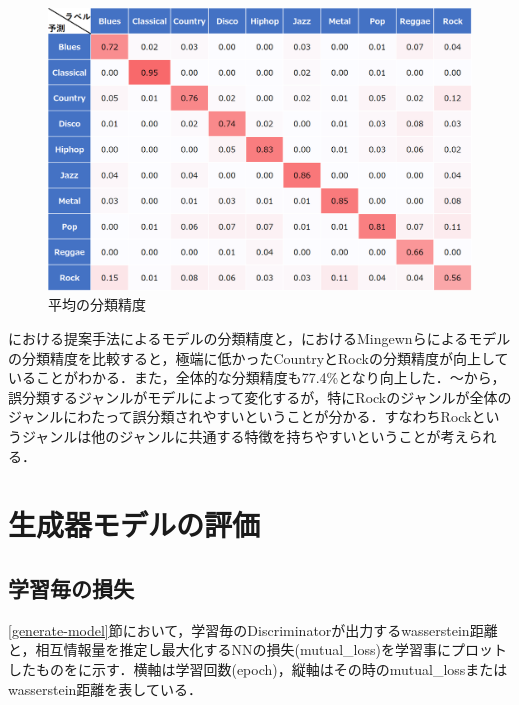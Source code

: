 \begin{figure}[htbp]
	\begin{center}
		\includegraphics[scale=0.5]{./images/classify-model/crossval.png}
		\caption{平均の分類精度}
		\label{fig:crossval}
	\end{center}
\end{figure}

における提案手法によるモデルの分類精度と，におけるMingewnらによるモデルの分類精度を比較すると，極端に低かったCountryとRockの分類精度が向上していることがわかる．また，全体的な分類精度も77.4\%となり向上した．～から，誤分類するジャンルがモデルによって変化するが，特にRockのジャンルが全体のジャンルにわたって誤分類されやすいということが分かる．すなわちRockというジャンルは他のジャンルに共通する特徴を持ちやすいということが考えられる．



\clearpage
\section{生成器モデルの評価}
\subsection{学習毎の損失}
\ref{generate-model}節において，学習毎のDiscriminatorが出力するwasserstein距離と，相互情報量を推定し最大化するNNの損失(mutual\_loss)を学習事にプロットしたものをに示す．横軸は学習回数(epoch)，縦軸はその時のmutual\_lossまたはwasserstein距離を表している．

